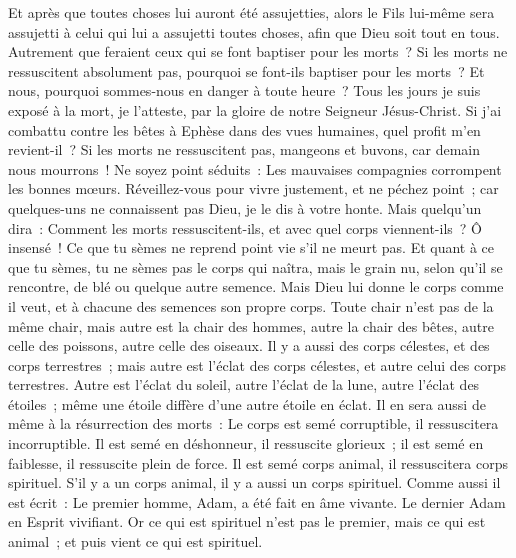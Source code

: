 \begin{multicols}{2}
Et après que toutes choses lui auront été assujetties, alors le Fils lui-même sera assujetti à celui qui lui a assujetti toutes choses, afin que Dieu soit tout en tous.
Autrement que feraient ceux qui se font baptiser pour les morts~? Si les morts ne ressuscitent absolument pas, pourquoi se font-ils baptiser pour les morts~?
Et nous, pourquoi sommes-nous en danger à toute heure~?
Tous les jours je suis exposé à la mort, je l'atteste, par la gloire de notre Seigneur Jésus-Christ.
Si j'ai combattu contre les bêtes à Ephèse dans des vues humaines, quel profit m'en revient-il~? Si les morts ne ressuscitent pas, mangeons et buvons, car demain nous mourrons~!
Ne soyez point séduits~: Les mauvaises compagnies corrompent les bonnes mœurs.
Réveillez-vous pour vivre justement, et ne péchez point~; car quelques-uns ne connaissent pas Dieu, je le dis à votre honte.
Mais quelqu'un dira~: Comment les morts ressuscitent-ils, et avec quel corps viennent-ils~?
Ô insensé~! Ce que tu sèmes ne reprend point vie s'il ne meurt pas.
Et quant à ce que tu sèmes, tu ne sèmes pas le corps qui naîtra, mais le grain nu, selon qu'il se rencontre, de blé ou quelque autre semence.
Mais Dieu lui donne le corps comme il veut, et à chacune des semences son propre corps.
Toute chair n'est pas de la même chair, mais autre est la chair des hommes, autre la chair des bêtes, autre celle des poissons, autre celle des oiseaux.
Il y a aussi des corps célestes, et des corps terrestres~; mais autre est l'éclat des corps célestes, et autre celui des corps terrestres.
Autre est l'éclat du soleil, autre l'éclat de la lune, autre l'éclat des étoiles~; même une étoile diffère d'une autre étoile en éclat.
Il en sera aussi de même à la résurrection des morts~: Le corps est semé corruptible, il ressuscitera incorruptible.
Il est semé en déshonneur, il ressuscite glorieux~; il est semé en faiblesse, il ressuscite plein de force.
Il est semé corps animal, il ressuscitera corps spirituel. S'il y a un corps animal, il y a aussi un corps spirituel.
Comme aussi il est écrit~: Le premier homme, Adam, a été fait en âme vivante. Le dernier Adam en Esprit vivifiant.
Or ce qui est spirituel n'est pas le premier, mais ce qui est animal~; et puis vient ce qui est spirituel.

\end{multicols}
